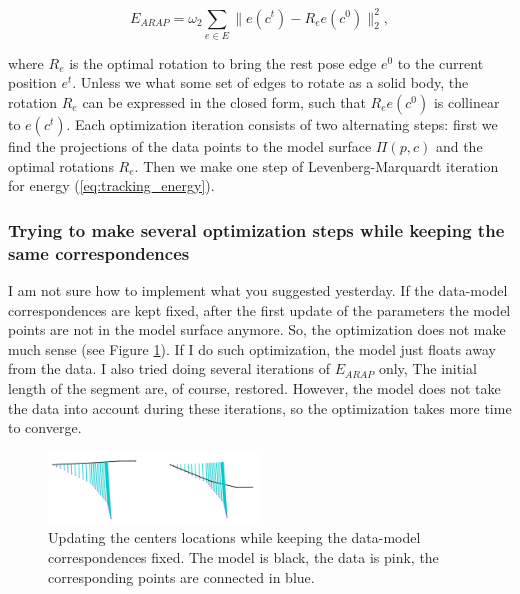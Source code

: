 \begin{equation}
	E_{ARAP} = \omega_2 \sum_{e \in E} \| e(c^t) - R_e e(c^0)\|_2^2,
\end{equation}

where $R_e$ is the optimal rotation to bring the rest pose edge $e^0$ to the current position $e^t$. Unless we what some set of edges to rotate as a solid body, the rotation $R_e$ can be expressed in the closed form, such that $R_e e(c^0)$ is collinear to $e(c^t)$. 
Each optimization iteration consists of two alternating steps: first we find the projections of the data points to the model surface $\Pi(p, c)$ and the optimal rotations $  R_e  $. Then we make one step of Levenberg-Marquardt iteration for energy (\ref{eq:tracking_energy}).

\subsubsection{Trying to make several optimization steps while keeping the same correspondences}

I am not sure how to implement what you suggested yesterday. If the data-model correspondences are kept fixed, after the first update of the parameters the model points are not in the model surface anymore. So, the optimization does not make much sense (see Figure \ref{fig:fixed_correspondences}). If I do such optimization, the model just floats away from the data.
I also tried doing several iterations of $E_{ARAP}$ only, The initial length of the segment are, of course, restored. However, the model does not take the data into account during these iterations, so the optimization takes more time to converge.

\begin{figure}[h!] 
	\centering
	\includegraphics[width=0.5\textwidth]{figures/fixed_correspondences}
	\caption{Updating the centers locations while keeping the data-model correspondences fixed. The model is black, the data is pink, the corresponding points are connected in blue.}
	\label{fig:fixed_correspondences}
\end{figure}